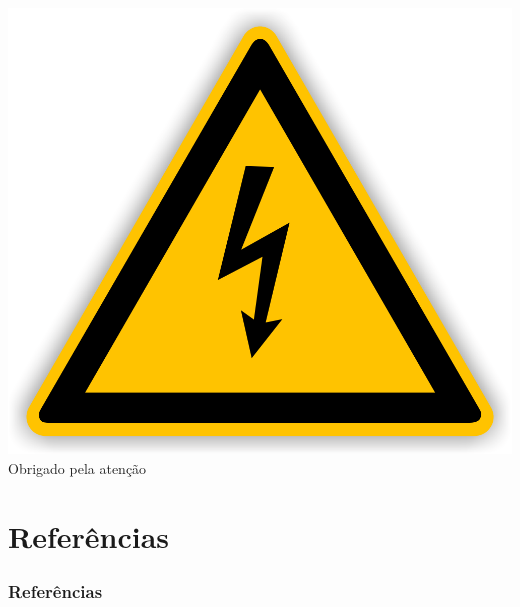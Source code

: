 \documentclass[12pt]{beamer}
\begin{document}
\begin{frame}
    \includegraphics[width=\textwidth]{eletricidade.png}
    \Huge{Obrigado pela atenção}
\end{frame}

\section{Referências}\label{Referências}
\begin{frame}[allowframebreaks]
    \frametitle{Referências} 
    
\end{frame}
\end{document}
